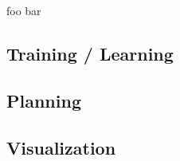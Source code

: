 foo bar

\subsection{\label{sec::RelatedWorkTrainingLearning}Training / Learning}

\subsection{\label{sec::RelatedWorkPlanning}Planning}

\subsection{\label{sec::RelatedWorkVisualization}Visualization}
